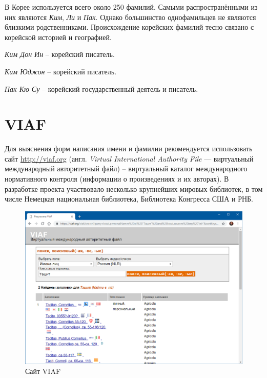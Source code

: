 В Корее используется всего около 250 фамилий. Самыми распространёнными из них являются \emph{Ким}, \emph{Ли} и \emph{Пак}. Однако большинство однофамильцев не являются близкими родственниками. Происхождение корейских фамилий тесно связано с корейской историей и географией.

\emph{Ким Дон Ин} -- корейский писатель.

\emph{Ким Юджон} -- корейский писатель.

\emph{Пак Кю Су} -- корейский государственный деятель и писатель.



\section{VIAF}

Для выяснения форм написания имени и фамилии рекомендуется использовать сайт \underline{http://viaf.org} (англ. \emph{Virtual International Authority File} — виртуальный международный авторитетный файл) -- виртуальный каталог международного нормативного контроля (информации о произведениях и их авторах). В разработке проекта участвовало несколько крупнейших мировых библиотек, в том числе Немецкая национальная библиотека, Библиотека Конгресса США и РНБ.

\begin{figure}
    \centering
    \includegraphics[width=\linewidth]{img/viaf}
    \caption{Сайт VIAF}
    \label{fig:viaf}
\end{figure}
